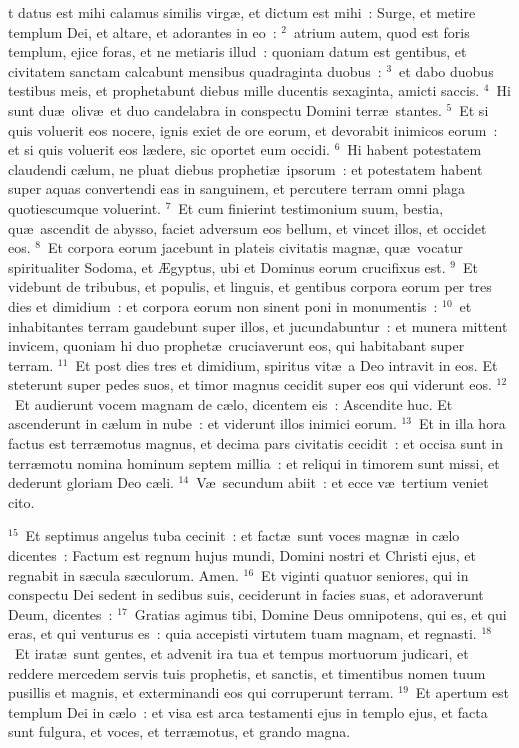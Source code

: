 \bchapter
{}t datus est mihi calamus similis virg\ae , et dictum est mihi~: Surge, et metire templum Dei, et altare, et adorantes in eo~:
${}^{2}$~atrium autem, quod est foris templum, ejice foras, et ne metiaris illud~: quoniam datum est gentibus, et civitatem sanctam calcabunt mensibus quadraginta duobus~:
${}^{3}$~et dabo duobus testibus meis, et prophetabunt diebus mille ducentis sexaginta, amicti saccis.
${}^{4}$~Hi sunt du\ae\ oliv\ae\ et duo candelabra in conspectu Domini terr\ae\ stantes.
${}^{5}$~Et si quis voluerit eos nocere, ignis exiet de ore eorum, et devorabit inimicos eorum~: et si quis voluerit eos l\ae dere, sic oportet eum occidi.
${}^{6}$~Hi habent potestatem claudendi c\ae lum, ne pluat diebus propheti\ae\ ipsorum~: et potestatem habent super aquas convertendi eas in sanguinem, et percutere terram omni plaga quotiescumque voluerint.
${}^{7}$~Et cum finierint testimonium suum, bestia, qu\ae\ ascendit de abysso, faciet adversum eos bellum, et vincet illos, et occidet eos.
${}^{8}$~Et corpora eorum jacebunt in plateis civitatis magn\ae , qu\ae\ vocatur spiritualiter Sodoma, et \AE gyptus, ubi et Dominus eorum crucifixus est.
${}^{9}$~Et videbunt de tribubus, et populis, et linguis, et gentibus corpora eorum per tres dies et dimidium~: et corpora eorum non sinent poni in monumentis~:
${}^{10}$~et inhabitantes terram gaudebunt super illos, et jucundabuntur~: et munera mittent invicem, quoniam hi duo prophet\ae\ cruciaverunt eos, qui habitabant super terram.
${}^{11}$~Et post dies tres et dimidium, spiritus vit\ae\ a Deo intravit in eos. Et steterunt super pedes suos, et timor magnus cecidit super eos qui viderunt eos.
${}^{12}$~Et audierunt vocem magnam de c\ae lo, dicentem eis~: Ascendite huc. Et ascenderunt in c\ae lum in nube~: et viderunt illos inimici eorum.
${}^{13}$~Et in illa hora factus est terr\ae motus magnus, et decima pars civitatis cecidit~: et occisa sunt in terr\ae motu nomina hominum septem millia~: et reliqui in timorem sunt missi, et dederunt gloriam Deo c\ae li.
${}^{14}$~V\ae\ secundum abiit~: et ecce v\ae\ tertium veniet cito.


${}^{15}$~Et septimus angelus tuba cecinit~: et fact\ae\ sunt voces magn\ae\ in c\ae lo dicentes~: Factum est regnum hujus mundi, Domini nostri et Christi ejus, et regnabit in s\ae cula s\ae culorum. Amen.
${}^{16}$~Et viginti quatuor seniores, qui in conspectu Dei sedent in sedibus suis, ceciderunt in facies suas, et adoraverunt Deum, dicentes~:
${}^{17}$~Gratias agimus tibi, Domine Deus omnipotens, qui es, et qui eras, et qui venturus es~: quia accepisti virtutem tuam magnam, et regnasti.
${}^{18}$~Et irat\ae\ sunt gentes, et advenit ira tua et tempus mortuorum judicari, et reddere mercedem servis tuis prophetis, et sanctis, et timentibus nomen tuum pusillis et magnis, et exterminandi eos qui corruperunt terram.
${}^{19}$~Et apertum est templum Dei in c\ae lo~: et visa est arca testamenti ejus in templo ejus, et facta sunt fulgura, et voces, et terr\ae motus, et grando magna.

